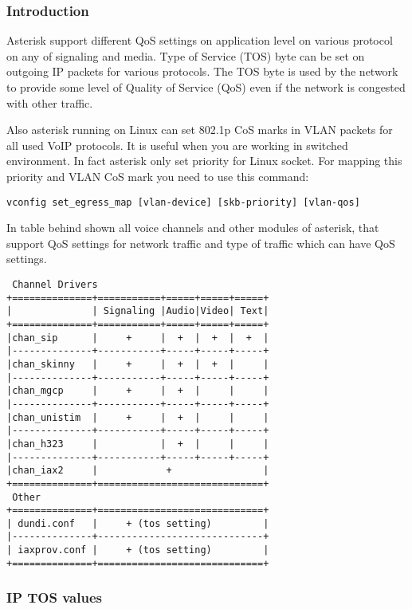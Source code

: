 \subsubsection{Introduction}

Asterisk support different QoS settings on application level on various protocol
on any of signaling and media. Type of Service (TOS) byte can be set on
outgoing IP packets for various protocols. The TOS byte is used by the network
to provide some level of Quality of Service (QoS) even if the network is
congested with other traffic.

Also asterisk running on Linux can set 802.1p CoS marks in VLAN packets for all
used VoIP protocols. It is useful when you are working in switched environment.
In fact asterisk only set priority for Linux socket. For mapping this priority
and VLAN CoS mark you need to use this command:

\begin{verbatim}
vconfig set_egress_map [vlan-device] [skb-priority] [vlan-qos]
\end{verbatim}

In table behind shown all voice channels and other modules of asterisk, that
support QoS settings for network traffic and type of traffic which can have
QoS settings.

\begin{verbatim}
 Channel Drivers
+==============+===========+=====+=====+=====+
|              | Signaling |Audio|Video| Text|
+==============+===========+=====+=====+=====+
|chan_sip      |     +     |  +  |  +  |  +  |
|--------------+-----------+-----+-----+-----+
|chan_skinny   |     +     |  +  |  +  |     |
|--------------+-----------+-----+-----+-----+
|chan_mgcp     |     +     |  +  |     |     |
|--------------+-----------+-----+-----+-----+
|chan_unistim  |     +     |  +  |     |     |
|--------------+-----------+-----+-----+-----+
|chan_h323     |           |  +  |     |     |
|--------------+-----------+-----+-----+-----+
|chan_iax2     |            +                |
+==============+=============================+
 Other
+==============+=============================+
| dundi.conf   |     + (tos setting)         |
|--------------+-----------------------------+
| iaxprov.conf |     + (tos setting)         |
+==============+=============================+
\end{verbatim}


\subsubsection{IP TOS values}

